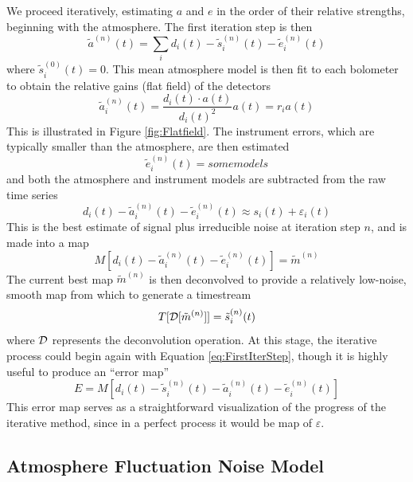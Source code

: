 \documentclass[12pt,preprint]{aastex}
\newcommand{\epsi}{\varepsilon}
\begin{document}
We proceed iteratively, estimating $a$ and $e$ in the order of their
relative strengths, beginning with the atmosphere.  The first
iteration step is then
\begin{equation}
\label{eq:FirstIterStep}
\tilde{a}^{(n)}(t) = 
\sum_i{d_i(t)-\tilde{s}^{(n)}_i(t) - \tilde{e}^{(n)}_i(t)}
\end{equation}
where $\tilde{s}^{(0)}_i(t)=0$.  This mean atmosphere model is then
fit to each bolometer to obtain the relative gains (flat field) of the
detectors
\begin{equation}
\tilde{a}^{(n)}_i(t) = \frac{d_i(t) \cdot a(t)}{d_i(t)^2} a(t) = r_i a(t)
\end{equation}
This is illustrated in Figure \ref{fig:Flatfield}.  The instrument
errors, which are typically smaller than the atmosphere, are then
estimated
\begin{equation}
\tilde{e}^{(n)}_i(t) = some models
\end{equation}
and both the atmosphere and instrument models are subtracted from the
raw time series
\begin{equation}
d_i(t) - \tilde{a}^{(n)}_i(t) - \tilde{e}^{(n)}_i(t)
\approx s_i(t) + \epsi_i(t)
\end{equation}
This is the best estimate of signal plus irreducible noise at
iteration step $n$, and is made into a map
\begin{equation}
M[d_i(t) - \tilde{a}^{(n)}_i(t) - \tilde{e}^{(n)}_i(t)] = \tilde{m}^{(n)}
\end{equation}
The current best map $\tilde{m}^{(n)}$ is then deconvolved to provide
a relatively low-noise, smooth map from which to generate a timestream
\begin{equation}
\label{eq:MapToTime}
T[{\cal D}[\tilde{m}^{(n)}]] = \tilde{s}^{(n)}_i(t)
\end{equation}
where ${\cal D}$ represents the deconvolution operation.  At this
stage, the iterative process could begin again with Equation
\ref{eq:FirstIterStep}, though it is highly useful to produce an
``error map''
\begin{equation}
E = M[d_i(t) - \tilde{s}^{(n)}_i(t) - \tilde{a}^{(n)}_i(t) - 
\tilde{e}^{(n)}_i(t)]
\end{equation}
This error map serves as a straightforward visualization of the
progress of the iterative method, since in a perfect process it would
be map of $\epsi$.

\subsection{Atmosphere Fluctuation Noise Model}
\end{document}
